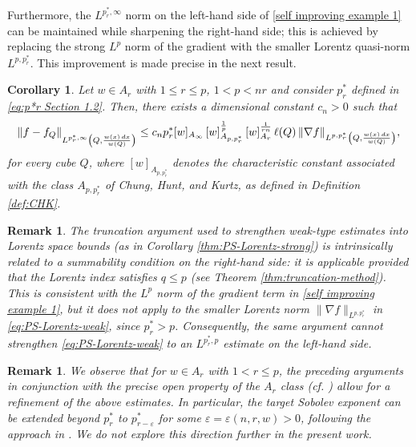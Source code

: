 \documentclass[reqno, 10pt, oneside]{amsart}
\numberwithin{equation}{section}
\newcommand{\strt}[1]{\rule{0pt}{#1}}
\newtheorem{corollary}[theorem]{Corollary}
\newtheorem{remark}[theorem]{Remark}
\numberwithin{theorem}{section}
\newcommand{\1}{{\rm 1\hspace*{-0.4ex}%
\rule{0.1ex}{1.52ex}\hspace*{0.2ex}}}
\begin{document}
Furthermore, the $L^{p_r^*,\infty}$ norm on the left-hand side of \eqref{self improving example 1}  can be maintained while sharpening the right-hand side; this is achieved by replacing the strong $L^p$ norm of the gradient with the smaller Lorentz quasi-norm $L^{p,p_r^*}$. This improvement is made precise in the next result.




\begin{corollary}\label{thm:PS-Lorentz-weak}
Let $w\in A_r$ with $1\le r\le p$, $1  < p< nr$ and consider $p_r^{*}$ defined in \eqref{eq:p*r Section 1.2}. Then, there exists a dimensional constant $c_n>0$ such that 
\begin{equation}\label{eq:PS-Lorentz-weak}
	\|f-f_Q\|_{\strt{2.3ex} L^{p_r^{*},\infty}\left(Q, \frac{w(x)\,dx}{w(Q)}\right)} \le c_n p^*_r [w]_{A_\infty}\,[w]_{A_{p,p_r^{*}}}^{\frac{1}{p}}\,[w]_{A_r}^{\frac{1}{rn}}\, \ell(Q) \,\|\nabla f\|_{L^{p,p_r^{*}}\left(Q,\frac{w(x)\,dx}{w(Q)}\right)} ,
\end{equation}
for every cube $Q$, where $[w]_{A_{p,p_r^{*}}}$ denotes the characteristic constant associated with the class $A_{p,p_r^{*}}$ of Chung, Hunt, and Kurtz, as defined in Definition \ref{def:CHK}. 
\end{corollary}


\begin{remark}
The truncation argument used to strengthen weak-type estimates into Lorentz space bounds (as in Corollary \ref{thm:PS-Lorentz-strong}) is intrinsically related to a summability condition on the right-hand side: it is applicable provided that the Lorentz index satisfies $q \le p$ (see Theorem \ref{thm:truncation-method}). This is consistent with the $L^p$ norm of the gradient term in \eqref{self improving example 1}, but it does not apply to the smaller Lorentz norm $\|\nabla f\|_{L^{p,p_r^{*}}}$ in \eqref{eq:PS-Lorentz-weak}, since $p_r^{*}>p$. Consequently, the same argument cannot strengthen \eqref{eq:PS-Lorentz-weak} to an $L^{p_r^{*},p}$ estimate on the left-hand side. 
\end{remark}




\begin{remark}
We observe that for $w \in A_r$ with $1 < r \le p$, the preceding arguments in conjunction with the precise open property of the $A_r$ class (cf. \cite{HPR, IPER}) allow for a refinement of the above estimates. In particular, the target Sobolev exponent can be extended beyond $p_r^*$ to $p_{r-\varepsilon}^*$ for some $\varepsilon = \varepsilon(n,r,w) > 0$, following the approach in \cite{ClarosJFA}. We do not explore this direction further in the present work.
\end{remark}
 
\end{document}
